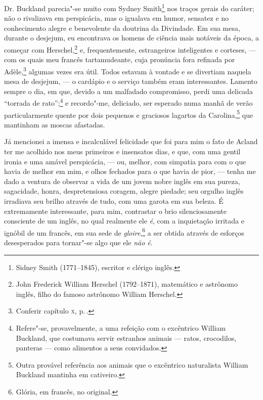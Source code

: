 Dr. Buckland parecia"-se muito com Sydney Smith\footnote{Sidney Smith
  (1771--1845), escritor e clérigo inglês.} nos traços
gerais do caráter; não o rivalizava em perspicácia, mas o igualava em
humor, sensatez e no conhecimento alegre e benevolente da doutrina da
Divindade. Em sua mesa, durante o desjejum, eu encontrava os homens de
ciência mais notáveis da época, a começar com Herschel,\footnote{John
  Frederick William Herschel (1792--1871), matemático e astrônomo inglês,
  filho do famoso astrônomo William Herschel.} e,
frequentemente, estrangeiros inteligentes e corteses, --- com os quais
meu francês tartamudeante, cuja pronúncia fora refinada por
Adèle,\footnote{Conferir capítulo \textsc{x}, p.\,\pageref{207}.} algumas
vezes era útil. Todos estavam à vontade e se divertiam naquela mesa de
desjejum, --- o cardápio e o serviço também eram interessantes. Lamento
sempre o dia, em que, devido a um malfadado compromisso, perdi uma
delicada ``torrada de rato'';\footnote{Refere"-se, provavelmente, a uma
  refeição com o excêntrico William Buckland, que costumava servir
  estranhos animais --- ratos, crocodilos, panteras --- como alimentos a
  seus convidados.} e recordo"-me, deliciado, ser
esperado numa manhã de verão particularmente quente por dois pequenos e
graciosos lagartos da Carolina,\footnote{Outra provável referência aos
  animais que o excêntrico naturalista William Buckland mantinha em
  cativeiro.} que mantinham as moscas afastadas.

Já mencionei a imensa e incalculável felicidade que foi para mim o
fato de Acland ter me acolhido nos meus primeiros e insensatos dias, e
que, com uma gentil ironia e uma amável perspicácia, --- ou, melhor, com
simpatia para com o que havia de melhor em mim, e olhos fechados para o
que havia de pior, --- tenha me dado a ventura de observar a vida de um
jovem nobre inglês em sua pureza, sagacidade, honra, despretensiosa
coragem, alegre piedade; seu orgulho inglês irradiava seu brilho através
de tudo, com uma garota em sua beleza. É extremamente interessante, para
mim, contrastar o brio silenciosamente consciente de um inglês, no qual
realmente ele \textit{é}, com a inquietação irritada e ignóbil de um
francês, em sua sede de \textit{gloire},\footnote{Glória, em francês, no
  original.} a ser obtida através de esforços
desesperados para tornar"-se algo que ele \textit{não é}.

